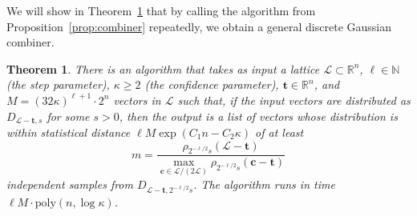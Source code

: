 \documentclass[11pt]{article}
\newtheorem{theorem}{Theorem}[section]
\newcommand{\N}{\ensuremath{\mathbb{N}}}
\newcommand{\R}{\ensuremath{\mathbb{R}}}
\renewcommand{\vec}[1]{\ensuremath{\mathbf{#1}}}
\newcommand{\poly}{\mathrm{poly}}
\newcommand{\lat}{\mathcal{L}}
\begin{document}
We will show in Theorem~\ref{thm:pipeline} that by calling the algorithm from Proposition~\ref{prop:combiner} repeatedly, we obtain a general discrete Gaussian combiner.

\begin{theorem}
\label{thm:pipeline}
There is an algorithm that takes as input a lattice $\lat \subset \R^n$, $\ell \in \N$ (the step parameter), 
$\kappa \geq 2$ (the confidence parameter), $\vec{t} \in \R^n$, and $M = (32\kappa)^{\ell+1} \cdot  2^n$ vectors in $\lat$ such that, if the input vectors are distributed as $D_{\lat-\vec{t}, s}$ for some $s > 0$, then the output is a list of vectors whose distribution is within statistical distance $\ell M \exp(C_1 n-C_2\kappa )$ of at least 
\[
m = \frac{ \rho_{2^{-\ell/2} s}(\lat - \vec{t})}{\max_{\vec{c} \in \lat/(2\lat)}\rho_{2^{-\ell/2} s}(\vec{c} - \vec{t})}
\] independent samples from $D_{\lat-\vec{t}, 2^{-\ell/2}s}$.
The algorithm runs in time $\ell M \cdot \poly(n,\log \kappa)$.
\end{theorem}
\end{document}
